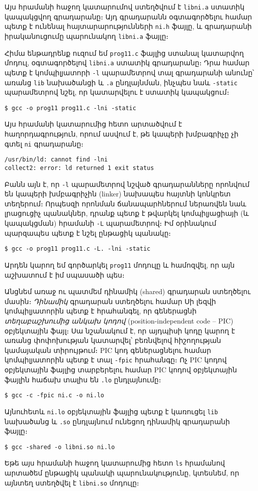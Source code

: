 Այս հրամանի հաջող կատարումով ստեղծվում է \texttt{libni.a}
ստատիկ կապակցվող գրադարանը։ Այդ գրադարանն օգտագործելու համար
պետք է ունենալ հայտարարությունների \texttt{ni.h} ֆայլը, և
գրադարանի իրականուցումը պարունակող \texttt{libni.a} ֆայլը։

Հիմա ենթադրենք ուզում եմ \texttt{prog11.c} ֆայլից ստանալ
կատարվող մոդուլ, օգտագործելով \texttt{libni.a} ստատիկ գրադարանը։
Դրա համար պետք է կոմպիլյատորի \Verb|-l| պարամետրով տալ գրադարանի
անունը՝ առանց \texttt{lib} նախածանցի և \Verb|.a| ընդլայնման,
ինչպես նաև \Verb|-static| պարամետրով նշել, որ կատարվելու է
ստատիկ կապակցում։

\begin{Verbatim}
$ gcc -o prog11 prog11.c -lni -static
\end{Verbatim}

Այս հրամանի կատարումից հետո արտածվում է հաղորդագրություն, որում
ասվում է, թե կապերի խմբագրիչը չի գտել \texttt{ni} գրադարանը։

\begin{Verbatim}
/usr/bin/ld: cannot find -lni
collect2: error: ld returned 1 exit status
\end{Verbatim}

Բանն այն է, որ \Verb|-l| պարամետրով նշված գրադարանները որոնվում
են կապերի խմբագրիչին (linker) նախապես հայտնի կոնկրետ տեղերում։
Որպեսզի որոնման ճանապարհներում ներառվեն նաև լրացուցիչ պանակներ,
դրանք պետք է թվարկել կոմպիլյացիայի (և կապակցման) հրամանի
\Verb|-L| պարամետրով։ Իմ օրինակում պարզապես պետք է նշել ընթացիկ
պանակը։

\begin{Verbatim}
$ gcc -o prog11 prog11.c -Լ. -lni -static
\end{Verbatim}

Արդեն կարող եմ գործարկել \texttt{prog11} մոդուլը և համոզվել,
որ այն աշխատում է իմ սպասածի պես։

Անցնեմ առաջ ու պատմեմ դինամիկ (shared) գրադարան ստեղծելու մասին։
\emph{Դինամիկ} գրադարան ստեղծելու համար Սի լեզվի կոմպիլյատորին
պետք է հրահանգել, որ գեներացնի \emph{տեղաբաշխումից անկախ կոդով}
(position-independent code -- PIC) օբյեկտային ֆայլ։ Սա նշանակում
է, որ այդպիսի կոդը կարող է առանց փոփոխության կատարվել՝ բեռնվելով
հիշողության կամայական տիրույթում։ PIC կոդ գեներացնելու համար
կոմպիլյատորին պետք է տալ \Verb|-fpic| հրահանգը։ Ոչ PIC կոդով
օբյեկտային ֆայլից տարբերելու համար PIC կոդով օբյեկտային ֆայլին
հաճախ տալիս են \Verb|.lo| ընդլայնումը։

\begin{Verbatim}
$ gcc -c -fpic ni.c -o ni.lo
\end{Verbatim}

Այնուհետև \texttt{ni.lo} օբյեկտային ֆայլից պետք է կառուցել
\texttt{lib} նախածանց և \texttt{.so} ընդլայնում ունեցող դինամիկ
գրադարանի ֆայլը։

\begin{Verbatim}
$ gcc -shared -o libni.so ni.lo
\end{Verbatim}

Եթե այս հրամանի հաջող կատարումից հետո \texttt{ls} հրամանով արտածեմ
ընթացիկ պանակի պարունակությունը, կտեսնեմ, որ այնտեղ ստեղծվել է
\texttt{libni.so} մոդուլը։

\endinput

_(դինամիկ գրադարանի օգտագործման մասին, օրինակ)_

